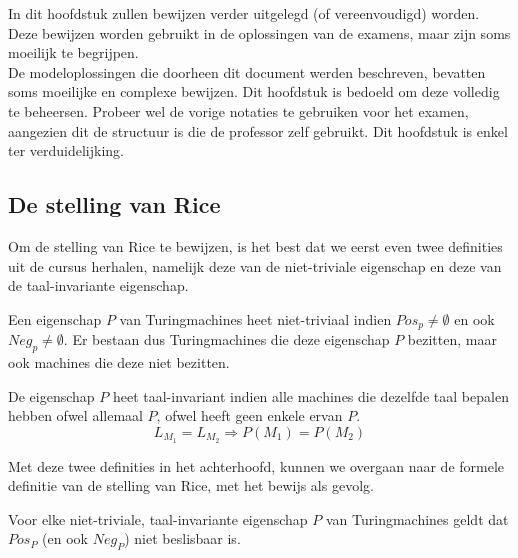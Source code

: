 \documentclass[
10pt,
a4paper,
oneside,
headinclude,footinclude, 
BCOR5mm,
]{scrartcl}
\begin{document}
\noindent In dit hoofdstuk zullen bewijzen verder uitgelegd (of vereenvoudigd) worden. Deze bewijzen worden gebruikt in de oplossingen van de examens, maar zijn soms moeilijk te begrijpen.\\

\noindent De modeloplossingen die doorheen dit document werden beschreven, bevatten soms moeilijke en complexe bewijzen. Dit hoofdstuk is bedoeld om deze volledig te beheersen. Probeer wel de vorige notaties te gebruiken voor het examen, aangezien dit de structuur is die de professor zelf gebruikt. Dit hoofdstuk is enkel ter verduidelijking.

\subsection{De stelling van Rice}

\noindent Om de stelling van Rice te bewijzen, is het best dat we eerst even twee definities uit de cursus herhalen, namelijk deze van de niet-triviale eigenschap en deze van de taal-invariante eigenschap.

\begin{theorem}
	Een eigenschap $P$ van Turingmachines heet niet-triviaal indien $Pos_p \neq \emptyset$ en ook $Neg_p \neq \emptyset$. Er bestaan dus Turingmachines die deze eigenschap $P$ bezitten, maar ook machines die deze niet bezitten.
\end{theorem}

\begin{theorem} 
	De eigenschap $P$ heet taal-invariant indien alle machines die dezelfde taal bepalen hebben ofwel allemaal $P$, ofwel heeft geen enkele ervan $P$.
	$$L_{M_1} = L_{M_2} \Rightarrow P(M_1) = P(M_2)$$
\end{theorem}

\noindent Met deze twee definities in het achterhoofd, kunnen we overgaan naar de formele definitie van de stelling van Rice, met het bewijs als gevolg.

\begin{theorem}
	Voor elke niet-triviale, taal-invariante eigenschap $P$ van Turingmachines geldt dat $Pos_P$ (en ook $Neg_P$) niet beslisbaar is.
\end{theorem}
\end{document}
